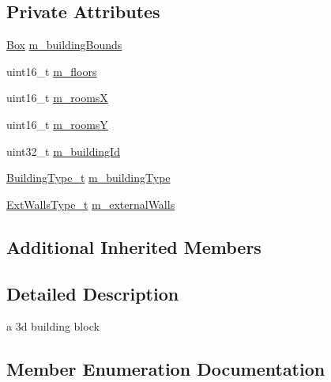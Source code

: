 \subsection*{Private Attributes}
\begin{DoxyCompactItemize}
\item 
\hyperlink{classns3_1_1Box}{Box} \hyperlink{classns3_1_1Building_aec4c01efb67198b28de7a51b69a8d857}{m\+\_\+building\+Bounds}
\item 
uint16\+\_\+t \hyperlink{classns3_1_1Building_a82496b3cc437fd47bdec4d510fdba302}{m\+\_\+floors}
\item 
uint16\+\_\+t \hyperlink{classns3_1_1Building_aadefd6e202170cfe4088ca978fa04464}{m\+\_\+roomsX}
\item 
uint16\+\_\+t \hyperlink{classns3_1_1Building_ac754f0013fd5d8dd69de871ada562f2a}{m\+\_\+roomsY}
\item 
uint32\+\_\+t \hyperlink{classns3_1_1Building_a19845ef02179e4e1363de6648b237959}{m\+\_\+building\+Id}
\item 
\hyperlink{classns3_1_1Building_af7f3940d00690b70af02310575d94ef3}{Building\+Type\+\_\+t} \hyperlink{classns3_1_1Building_a1d867df5fda29c3596f7fa8b899f7e66}{m\+\_\+building\+Type}
\item 
\hyperlink{classns3_1_1Building_a298adc08038580830c70d4cac8fcfefe}{Ext\+Walls\+Type\+\_\+t} \hyperlink{classns3_1_1Building_a2a1fd1627ce2344fb1b3b1b2cb579cc8}{m\+\_\+external\+Walls}
\end{DoxyCompactItemize}
\subsection*{Additional Inherited Members}


\subsection{Detailed Description}
a 3d building block 

\subsection{Member Enumeration Documentation}
